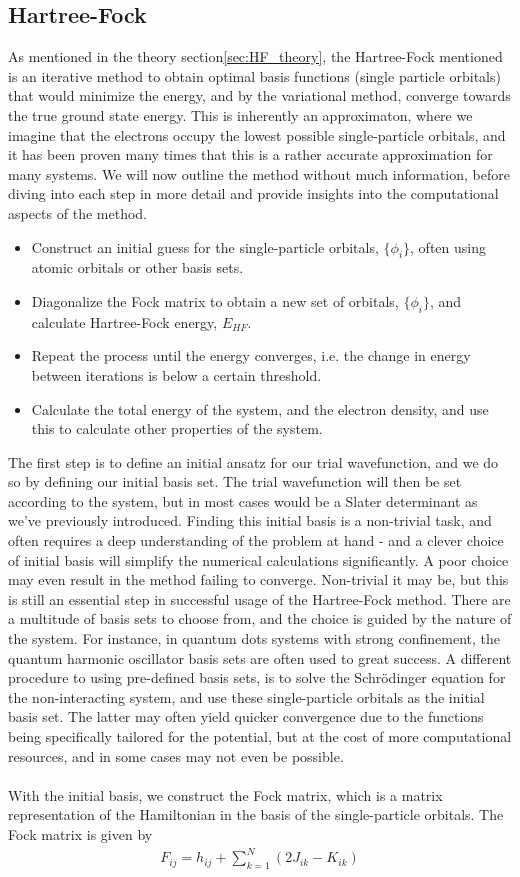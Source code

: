\documentclass{subfiles}
\begin{document}
\subsection{Hartree-Fock}
As mentioned in the theory section\ref{sec:HF_theory}, the Hartree-Fock mentioned is an iterative method to obtain optimal basis functions (single particle orbitals) that would minimize the energy, and by the variational method, converge towards the true ground state energy. This is inherently an approximaton, where we imagine that the electrons occupy the lowest possible single-particle orbitals, and it has been proven many times that this is a rather accurate approximation for many systems. 
We will now outline the method without much information, before diving into each step in more detail and provide insights into the computational aspects of the method.
\begin{itemize}
    \item Construct an initial guess for the single-particle orbitals, $\{\phi_i\}$, often using atomic orbitals or other basis sets.
    \item Diagonalize the Fock matrix to obtain a new set of orbitals, $\{\phi_i\}$, and calculate Hartree-Fock energy, $E_{HF}$.
    \item Repeat the process until the energy converges, i.e. the change in energy between iterations is below a certain threshold.
    \item Calculate the total energy of the system, and the electron density, and use this to calculate other properties of the system.
\end{itemize}
The first step is to define an initial ansatz for our trial wavefunction, and we do so by defining our initial basis set. The trial wavefunction will then be set according to the system, but in most cases would be a Slater determinant as we've previously introduced. Finding this initial basis is a non-trivial task, and often requires a deep understanding of the problem at hand - and a clever choice of initial basis will simplify the numerical calculations significantly. A poor choice may even result in the method failing to converge. Non-trivial it may be, but this is still an essential step in successful usage of the Hartree-Fock method. There are a multitude of basis sets to choose from, and the choice is guided by the nature of the system. For instance, in quantum dots systems with strong confinement, the quantum harmonic oscillator basis sets are often used to great success\cite{Yuan_2017}. A different procedure to using pre-defined basis sets, is to solve the Schrödinger equation for the non-interacting system, and use these single-particle orbitals as the initial basis set. The latter may often yield quicker convergence due to the functions being specifically tailored for the potential, but at the cost of more computational resources, and in some cases may not even be possible. 
\\
\\ With the initial basis, we construct the Fock matrix, which is a matrix representation of the Hamiltonian in the basis of the single-particle orbitals. The Fock matrix is given by
\begin{align*}
    F_{ij} = h_{ij} + \sum_{k=1}^N\left(2J_{ik} - K_{ik}\right)
\end{align*}
\end{document}
